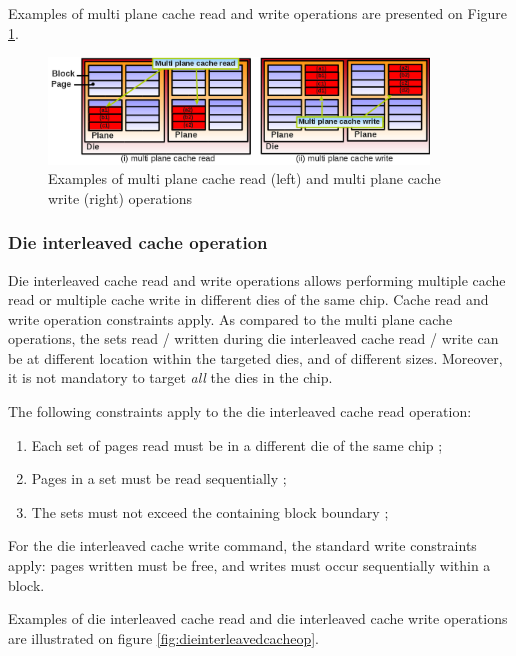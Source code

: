 Examples of multi plane cache read and write operations are presented on Figure \ref{fig:multiplanecacheop}.

\begin{figure}
  \center
  \includegraphics[width=0.9\textwidth]{Includes/MultiPlaneCacheOp.png}
  \caption{Examples of multi plane cache read (left) and multi plane cache write (right) operations}
  \label{fig:multiplanecacheop}
\end{figure}

\subsubsection{Die interleaved cache operation}
Die interleaved cache read and write operations allows performing multiple cache read or multiple cache write in different dies of the same chip. Cache read and write operation constraints apply. As compared to the multi plane cache operations, the sets read / written during die interleaved cache read / write can be at different location within the targeted dies, and of different sizes. Moreover, it is not mandatory to target \emph{all} the dies in the chip.

The following constraints apply to the die interleaved cache read operation:

\begin{enumerate}
  \item Each set of pages read must be in a different die of the same chip ;
  \item Pages in a set must be read sequentially ;
  \item The sets must not exceed the containing block boundary ;
\end{enumerate}

For the die interleaved cache write command, the standard write constraints apply: pages written must be free, and writes must occur sequentially within a block.

Examples of die interleaved cache read and die interleaved cache write operations are illustrated on figure \ref{fig:dieinterleavedcacheop}.

